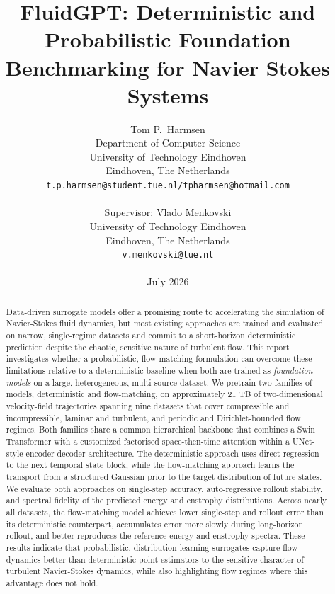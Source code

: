 \documentclass{report}
\title{FluidGPT: Deterministic and Probabilistic Foundation Benchmarking for Navier Stokes Systems}
\author{%
  Tom P.~Harmsen\\
  Department of Computer Science\\
  University of Technology Eindhoven\\
  Eindhoven, The Netherlands \\
  \texttt{t.p.harmsen@student.tue.nl/tpharmsen@hotmail.com} \\
  \\
  Supervisor: Vlado Menkovski \\
  University of Technology Eindhoven \\
  Eindhoven, The Netherlands \\
  \texttt{v.menkovski@tue.nl} \\
  \\
  July 2026
}
\begin{document}
\maketitle

\begin{abstract}
Data-driven surrogate models offer a promising route to accelerating the simulation of Navier-Stokes fluid dynamics, but most existing approaches are trained and evaluated on narrow, single-regime datasets and commit to a short-horizon deterministic prediction despite the chaotic, sensitive nature of turbulent flow. This report investigates whether a probabilistic, flow-matching formulation can overcome these limitations relative to a deterministic baseline when both are trained as \textit{foundation models} on a large, heterogeneous, multi-source dataset. We pretrain two families of models, deterministic and flow-matching, on approximately 21 TB of two-dimensional velocity-field trajectories spanning nine datasets that cover compressible and incompressible, laminar and turbulent, and periodic and Dirichlet-bounded flow regimes. Both families share a common hierarchical backbone that combines a Swin Transformer with a customized factorised space-then-time attention within a UNet-style encoder-decoder architecture. The deterministic approach uses direct regression to the next temporal state block, while the flow-matching approach learns the transport from a structured Gaussian prior to the target distribution of future states. We evaluate both approaches on single-step accuracy, auto-regressive rollout stability, and spectral fidelity of the predicted energy and enstrophy distributions. Across nearly all datasets, the flow-matching model achieves lower single-step and rollout error than its deterministic counterpart, accumulates error more slowly during long-horizon rollout, and better reproduces the reference energy and enstrophy spectra. These results indicate that probabilistic, distribution-learning surrogates capture flow dynamics better than deterministic point estimators to the sensitive character of turbulent Navier-Stokes dynamics, while also highlighting flow regimes where this advantage does not hold.
\end{abstract}

\tableofcontents
\newpage










%
%




\end{document}
